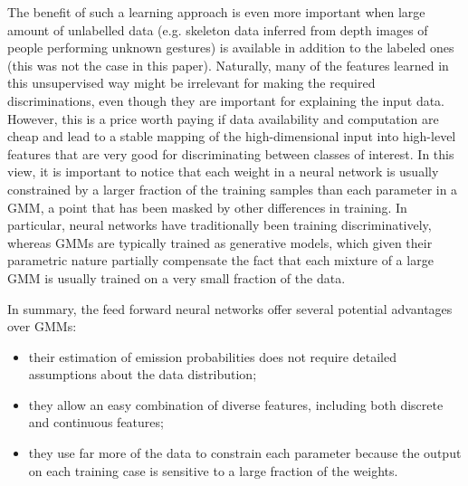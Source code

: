The benefit of such a learning approach is even more important when large amount of unlabelled data (e.g. skeleton data
 inferred from depth images of people performing unknown gestures) is available in addition to the labeled ones
(this was not the case in this paper).
%
%
Naturally, many of the  features learned in this unsupervised way might  be irrelevant for making the required discriminations,
even though they are important for explaining the input data.
However, this is a price worth paying if data availability and computation are cheap and
lead to  a stable mapping of the high-dimensional input  into high-level features
that are very good for discriminating between classes of interest.
%
In this view, it is important to notice that each weight in a neural network is usually constrained by a larger fraction of
the training samples than each parameter in a GMM, a point that has been masked by other differences in training.
In particular,  neural networks have traditionally been training discriminatively, whereas GMMs are typically trained as generative models,
which given their parametric  nature  partially compensate the fact that each mixture
of a large GMM is usually trained on a very small fraction of the data.

In summary, the feed forward neural networks offer several potential advantages over GMMs:
\begin{itemize}
\item their estimation of emission  probabilities does not require detailed assumptions about the data distribution;
\item they allow an easy combination of diverse features, including both discrete and continuous features;
\item they use far more of the data to constrain each parameter because the output on each training case
is sensitive to a large fraction of the weights.
\end{itemize}




